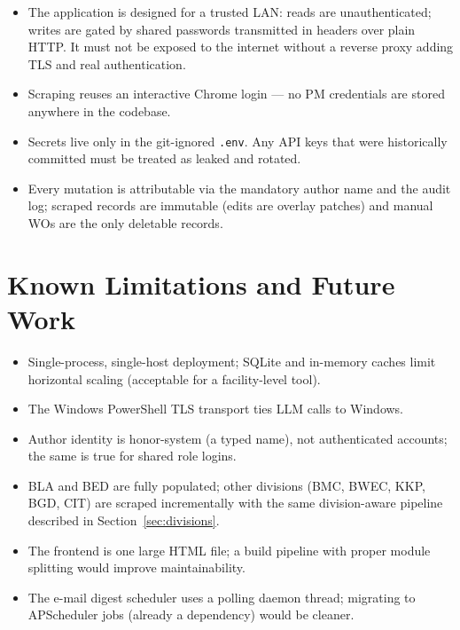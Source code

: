 \documentclass[11pt,a4paper]{article}
\newcommand{\code}[1]{\texttt{#1}}
\begin{document}
\begin{itemize}
    \item The application is designed for a trusted LAN: reads are
          unauthenticated; writes are gated by shared passwords transmitted
          in headers over plain HTTP. It must not be exposed to the
          internet without a reverse proxy adding TLS and real
          authentication.
    \item Scraping reuses an interactive Chrome login --- no PM credentials
          are stored anywhere in the codebase.
    \item Secrets live only in the git-ignored \code{.env}. Any API keys
          that were historically committed must be treated as leaked and
          rotated.
    \item Every mutation is attributable via the mandatory author name and
          the audit log; scraped records are immutable (edits are overlay
          patches) and manual WOs are the only deletable records.
\end{itemize}

\section{Known Limitations and Future Work}

\begin{itemize}
    \item Single-process, single-host deployment; SQLite and in-memory
          caches limit horizontal scaling (acceptable for a facility-level
          tool).
    \item The Windows PowerShell TLS transport ties LLM calls to Windows.
    \item Author identity is honor-system (a typed name), not authenticated
          accounts; the same is true for shared role logins.
    \item BLA and BED are fully populated; other divisions (BMC, BWEC, KKP,
          BGD, CIT) are scraped incrementally with the same division-aware
          pipeline described in Section~\ref{sec:divisions}.
    \item The frontend is one large HTML file; a build pipeline with proper
          module splitting would improve maintainability.
    \item The e-mail digest scheduler uses a polling daemon thread;
          migrating to APScheduler jobs (already a dependency) would be
          cleaner.
\end{itemize}
\end{document}

